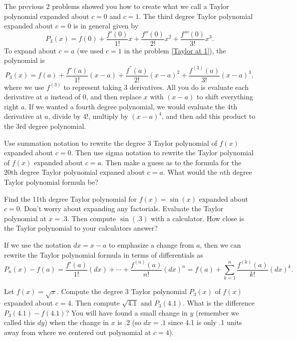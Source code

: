 The previous 2 problems showed you how to create what we call a Taylor polynomial expanded about $c=0$ and $c=1$. The third  degree Taylor polynomial expanded about $c=0$ is in general given by 
$$P_3(x) = f(0)+\frac{f'(0)}{1!}x+\frac{f''(0)}{2!}x^2+\frac{f'''(0)}{3!}x^3. $$  
To expand about $c=a$ (we used $c=1$ in the problem \ref{Taylor at 1}), the polynomial is 
$$P_3(x) = f(a)+\frac{f'(a)}{1!}(x-a)+\frac{f^{''}(a)}{2!}(x-a)^2+\frac{f^{(3)}(a)}{3!}(x-a)^3,$$
where we use $f^{(3)}$ to represent taking 3 derivatives. 
All you do is evaluate each derivative at $a$ instead of $0$, and then replace $x$ with $(x-a)$ to shift everything right $a$. If we wanted a fourth degree polynomial, we would evaluate the 4th derivative at $a$, divide by $4!$, multiply by $(x-a)^4$, and then add this product to the 3rd degree polynomial. 

\begin{problem}%
 Use summation notation to rewrite the degree 3 Taylor polynomial of $f(x)$ expanded about $c=0$. Then use sigma notation to rewrite the Taylor polynomial of $f(x)$ expanded about $c=a$. Then make a guess as to the formula for the 20th degree Taylor polynomial expaned about $c=a$. What would the $n$th degree Taylor polynomial formula be?
\end{problem}

\begin{problem}
 Find the 11th degree Taylor polynomial for $f(x)=\sin(x)$ expanded about $c=0$. Don't worry about expanding any factorials. Evaluate the Taylor polynomial at $x=.3$.  Then compute $\sin (.3)$ with a calculator. How close is the Taylor polynomial to your calculators answer?
\end{problem}


If we use the notation $dx=x-a$ to emphasize a change from $a$, then we can rewrite the Taylor polynomial formula in terms of differentials as
$$P_n(x) -f(a) = \frac{f'(a)}{1!}(dx)+\cdots +\frac{f^{(n)}(a)}{n!}(dx)^n = f(a)+\sum_{k=1}^n \frac{f^{(k)}(a)}{k!}(dx)^k. $$ 

\begin{problem}
Let $f(x)=\sqrt{x}$.  Compute the degree 3 Taylor polynomial $P_3(x)$ of $f(x)$ expanded about $c=4$. Then compute $\sqrt{4.1}$ and $P_3(4.1)$.  What is the difference $P_3(4.1)-f(4.1)$? 
You will have found a small change in $y$ (remember we called this $dy$) when the change in $x$ is .2 (so $dx=.1$ since 4.1 is only .1 units away from where we centered out polynomial at $c=4$).
\end{problem}

